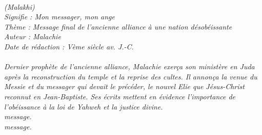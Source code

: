 \BFont
\noindent\hrulefill
\textit{
\bigskip
{\centering{}
\\(Malakhi)
\\Signifie : Mon messager, mon ange
\\Thème : Message final de l'ancienne alliance à une nation désobéissante
\\Auteur : Malachie
\\Date de rédaction : Vème siècle av. J.-C.\\}
}
\textit{
\\Dernier prophète de l’ancienne alliance, Malachie exerça son ministère en Juda après la reconstruction du temple et la reprise des cultes. Il annonça la venue du Messie et du messager qui devait le précéder, le nouvel Elie que Jésus-Christ reconnut en Jean-Baptiste. Ses écrits mettent en évidence l’importance de l’obéissance à la loi de Yahweh et la justice divine.
\bigskip
\\message. 
\bigskip
\\message.\bigskip
}
\par\nobreak\noindent\hrulefill
